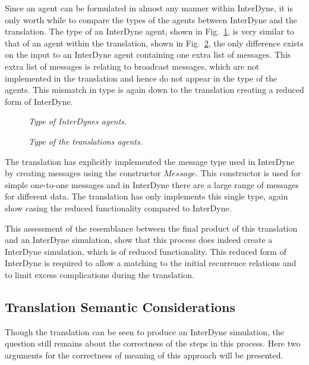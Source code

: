 \documentclass{article}
\begin{document}
Since an agent can be formulated in almost any manner within InterDyne, it is only worth while to compare the types of the agents between InterDyne and the translation. The type of an InterDyne agent, shown in Fig.~\ref{fig:agentpint}, is very similar to that of an agent within the translation, shown in Fig.~\ref{fig:agenttrans}, the only difference exists on the input to an InterDyne agent containing one extra list of messages. This extra list of messages is relating to broadcast messages, which are not implemented in the translation and hence do not appear in the type of the agents. This mismatch in type is again down to the translation creating a reduced form of InterDyne. 
\begin{figure}[H]
	\centering
	
	\caption{\it Type of InterDynes agents.}
	\label{fig:agentpint}
\end{figure} 
\begin{figure}[H]
	\centering
	
	\caption{\it Type of the translations agents.}
	\label{fig:agenttrans}
\end{figure} 

The translation has explicitly implemented the message type used in InterDyne by creating messages using the constructor $Message$. This constructor is used for simple one-to-one messages and in InterDyne there are a large range of messages for different data. The translation has only implements this single type, again show casing the reduced functionality compared to InterDyne.   

This assessment of the resemblance between the final product of this translation and an InterDyne simulation, show that this process does indeed create a InterDyne simulation, which is of reduced functionality. This reduced form of InterDyne is required to allow a matching to the initial recurrence relations and to limit excess complications during the translation.



\subsection{Translation Semantic Considerations} %
Though the translation can be seen to produce an InterDyne simulation, the question still remains about the correctness of the steps in this process. Here two arguments for the correctness of meaning of this approach will be presented.  
\end{document}
